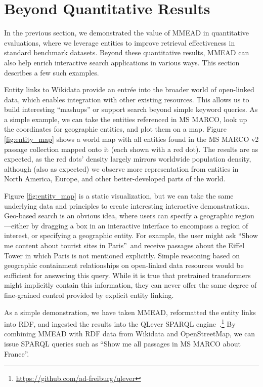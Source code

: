 \section{Beyond Quantitative Results}
In the previous section, we demonstrated the value of MMEAD in quantitative evaluations, where we leverage entities to improve retrieval effectiveness in standard benchmark datasets.
Beyond these quantitative results, MMEAD can also help enrich interactive search applications in various ways.
This section describes a few such examples.

Entity links to Wikidata provide an entr\'ee into the broader world of open-linked data, which enables integration with other existing resources.
This allows us to build interesting ``mashups'' or support search beyond simple keyword queries.
As a simple example, we can take the entities referenced in MS MARCO, look up the coordinates for geographic entities, and plot them on a map. 
Figure \ref{fig:entity_map} shows a world map with all entities found in the MS MARCO v2 passage collection mapped onto it (each shown with a red dot).
The results are as expected, as the red dots' density largely mirrors worldwide population density, although (also as expected) we observe more representation from entities in North America, Europe, and other better-developed parts of the world.



Figure \ref{fig:entity_map} is a static visualization, but we can take the same underlying data and principles to create interesting interactive demonstrations.
Geo-based search is an obvious idea, where users can specify a geographic region---either by dragging a box in an interactive interface to encompass a region of interest, or specifying a geographic entity.
For example, the user might ask ``Show me content about tourist sites in Paris''\ and receive passages about the Eiffel Tower in which Paris is not mentioned explicitly.
Simple reasoning based on geographic containment relationships on open-linked data resources would be sufficient for answering this query.
While it is true that pretrained transformers might implicitly contain this information, they can never offer the same degree of fine-grained control provided by explicit entity linking.

As a simple demonstration, we have taken MMEAD, reformatted the entity links into RDF, and ingested the results into the QLever SPARQL engine~\citep{qlever}.\footnote{\url{https://github.com/ad-freiburg/qlever}}
By combining MMEAD with RDF data from Wikidata and OpenStreetMap, we can issue SPARQL queries such as ``Show me all passages in MS MARCO about France''.

